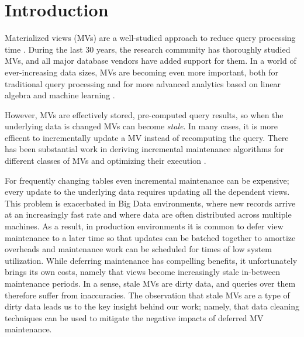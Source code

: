 \vspace{-0.5em}
\section{Introduction}
Materialized views (MVs) are a well-studied approach to reduce query processing time \cite{LarsonY85, gupta1995maintenance, chirkova2011materialized, halevy2001answering}.
During the last 30 years, the research community has thoroughly studied MVs, and all major database vendors have added support for them.
In a world of ever-increasing data sizes, MVs are becoming even more important, both for traditional query processing
 \cite{lefevre2014opportunistic, bailis2014scalable, perez2014history} and for more advanced analytics based on linear algebra and machine learning \cite{nikolic2014linview, zhang2014mat}.

However, MVs are effectively stored, pre-computed query results, so when the underlying data is changed MVs can become \emph{stale}. 
In many cases, it is more efficent to incrementally update a MV instead of recomputing the query.
There has been substantial work in deriving incremental maintenance algorithms for different classes of MVs and optimizing their execution \cite{gupta1995maintenance, DBLP:conf/sigmod/GriffinL95, griffin1997improved, samtani1999self, DBLP:conf/sac/TrutaC07, DBLP:journals/vldb/KochAKNNLS14, chirkova2011materialized}.

For frequently changing tables even incremental maintenance can be expensive; every update to the underlying data requires updating all the dependent views.  
This problem is exacerbated in Big Data environments, where new records arrive at an increasingly fast rate and where data are often 
distributed across multiple machines.  
As a result, in production environments it is common to defer view maintenance to a later time \cite{chirkova2011materialized, zhou2007lazy, DBLP:conf/sigmod/ColbyGLMT96} so that updates can be batched together to amortize overheads and maintenance work can be scheduled for times of low system utilization.  
While deferring maintenance has compelling benefits, it unfortunately brings its own costs, namely that views become increasingly stale in-between maintenance periods.   
In a sense, stale MVs are dirty data, and queries over them therefore suffer from inaccuracies.   
The observation that stale MVs are a type of dirty data leads us to the key insight behind our work; namely, that data cleaning techniques can be used to mitigate the negative impacts of deferred MV maintenance.  


